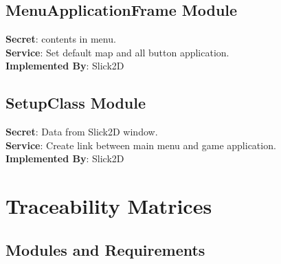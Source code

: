 \documentclass[12,english]{article}
\begin{document}
	\subsection{MenuApplicationFrame Module}
	\textbf{Secret}: contents in menu. \\
	\textbf{Service}: Set default map and all button application.  \\ 
	\textbf{Implemented By}: Slick2D\\
	
	\subsection{SetupClass Module}
	\textbf{Secret}: Data from Slick2D window. \\
	\textbf{Service}: Create link between main menu and game application.  \\ 
	\textbf{Implemented By}: Slick2D\\
	
	
\section{Traceability Matrices}

\subsection{Modules and Requirements}
\end{document}

